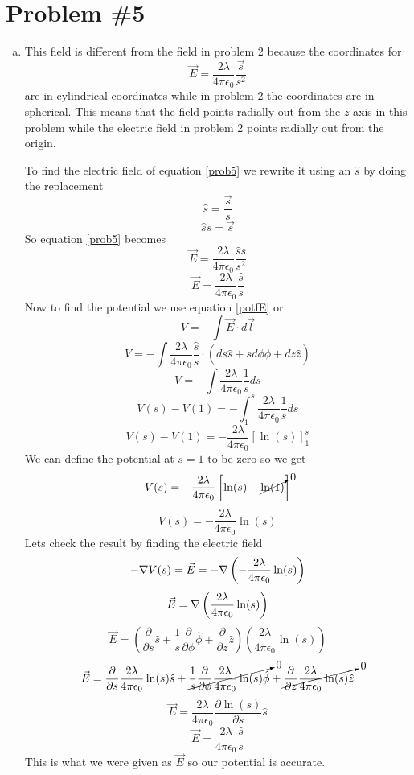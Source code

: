 \documentclass[11pt]{article}
\numberwithin{equation}{section}
\newcommand{\grad}{\bold\nabla}
\newcommand{\vecE}{\vec{E}}
\begin{document}
\section{Problem \#5}
\begin{enumerate}[(a)]
\item
This field is different from the field in problem 2 because the coordinates for 
\begin{equation}
\vecE = \frac{2\lambda}{4\pi\epsilon_0}\frac{\vec{s}}{s^2}
\label{prob5}
\end{equation}
are in cylindrical coordinates while in problem 2 the coordinates are in spherical. This means that the field points radially out from the $z$ axis in this problem while the electric field in problem 2 points radially out from the origin.

To find the electric field of equation \ref{prob5} we rewrite it using an $\hat{s}$ by doing the replacement 
$$\hat{s} = \frac{\vec{s}}{s}$$
$$\hat{s}s = \vec{s}$$
So equation \ref{prob5} becomes
$$\vecE = \frac{2\lambda}{4\pi\epsilon_0}\frac{\hat{s}s}{s^2}$$
$$\vecE = \frac{2\lambda}{4\pi\epsilon_0}\frac{\hat{s}}{s}$$
Now to find the potential we use equation \ref{potfE} or
$$V = -\int \vecE\cdot d\vec{l}$$
$$V = -\int \frac{2\lambda}{4\pi\epsilon_0}\frac{\hat{s}}{s}\cdot (ds\hat{s}+sd\phi\hat{\phi}+dz\hat{z})$$
$$V = -\int \frac{2\lambda}{4\pi\epsilon_0}\frac{1}{s}ds$$
$$V(s) - V(1) = -\int_1^s \frac{2\lambda}{4\pi\epsilon_0}\frac{1}{s}ds$$
$$V(s) - V(1) = -\frac{2\lambda}{4\pi\epsilon_0}\left[\ln(s)\right]_1^s$$
We can define the potential at $s=1$ to be zero so we get
$$V(s) = -\frac{2\lambda}{4\pi\epsilon_0}\left[\ln(s) - \cancelto{0}{\ln(1)}\right]$$
$$V(s) = -\frac{2\lambda}{4\pi\epsilon_0}\ln(s)$$
Lets check the result by finding the electric field
$$-\grad V(s) = \vecE = -\grad\left(-\frac{2\lambda}{4\pi\epsilon_0}\ln(s)\right)$$
$$\vecE = \grad\left(\frac{2\lambda}{4\pi\epsilon_0}\ln(s)\right)$$
$$\vecE = \left(\frac{\partial}{\partial s}\hat{s} +\frac{1}{s}\frac{\partial}{\partial \phi}\hat{\phi} +\frac{\partial}{\partial z}\hat{z} \right) \left(\frac{2\lambda}{4\pi\epsilon_0}\ln(s)\right)$$
$$\vecE = \frac{\partial}{\partial s}\frac{2\lambda}{4\pi\epsilon_0}\ln(s)\hat{s} +\cancelto{0}{\frac{1}{s}\frac{\partial}{\partial \phi}\frac{2\lambda}{4\pi\epsilon_0}\ln(s)\hat{\phi}} +\cancelto{0}{\frac{\partial}{\partial z}\frac{2\lambda}{4\pi\epsilon_0}\ln(s)\hat{z}}$$ 
$$\vecE = \frac{2\lambda}{4\pi\epsilon_0}\frac{\partial\ln(s)}{\partial s}\hat{s}$$
$$\vecE = \frac{2\lambda}{4\pi\epsilon_0}\frac{\hat{s}}{s}$$
This is what we were given as $\vecE$ so our potential is accurate.

\end{enumerate}
\end{document}
